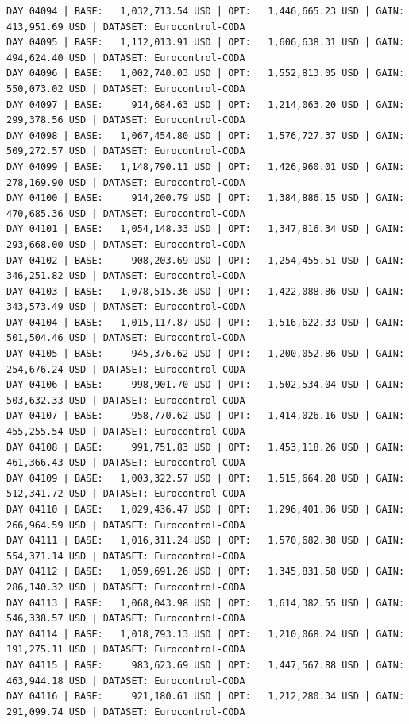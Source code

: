 \documentclass[11pt,a4paper]{article}
\begin{document}
\begin{verbatim}
DAY 04094 | BASE:   1,032,713.54 USD | OPT:   1,446,665.23 USD | GAIN: 413,951.69 USD | DATASET: Eurocontrol-CODA
DAY 04095 | BASE:   1,112,013.91 USD | OPT:   1,606,638.31 USD | GAIN: 494,624.40 USD | DATASET: Eurocontrol-CODA
DAY 04096 | BASE:   1,002,740.03 USD | OPT:   1,552,813.05 USD | GAIN: 550,073.02 USD | DATASET: Eurocontrol-CODA
DAY 04097 | BASE:     914,684.63 USD | OPT:   1,214,063.20 USD | GAIN: 299,378.56 USD | DATASET: Eurocontrol-CODA
DAY 04098 | BASE:   1,067,454.80 USD | OPT:   1,576,727.37 USD | GAIN: 509,272.57 USD | DATASET: Eurocontrol-CODA
DAY 04099 | BASE:   1,148,790.11 USD | OPT:   1,426,960.01 USD | GAIN: 278,169.90 USD | DATASET: Eurocontrol-CODA
DAY 04100 | BASE:     914,200.79 USD | OPT:   1,384,886.15 USD | GAIN: 470,685.36 USD | DATASET: Eurocontrol-CODA
DAY 04101 | BASE:   1,054,148.33 USD | OPT:   1,347,816.34 USD | GAIN: 293,668.00 USD | DATASET: Eurocontrol-CODA
DAY 04102 | BASE:     908,203.69 USD | OPT:   1,254,455.51 USD | GAIN: 346,251.82 USD | DATASET: Eurocontrol-CODA
DAY 04103 | BASE:   1,078,515.36 USD | OPT:   1,422,088.86 USD | GAIN: 343,573.49 USD | DATASET: Eurocontrol-CODA
DAY 04104 | BASE:   1,015,117.87 USD | OPT:   1,516,622.33 USD | GAIN: 501,504.46 USD | DATASET: Eurocontrol-CODA
DAY 04105 | BASE:     945,376.62 USD | OPT:   1,200,052.86 USD | GAIN: 254,676.24 USD | DATASET: Eurocontrol-CODA
DAY 04106 | BASE:     998,901.70 USD | OPT:   1,502,534.04 USD | GAIN: 503,632.33 USD | DATASET: Eurocontrol-CODA
DAY 04107 | BASE:     958,770.62 USD | OPT:   1,414,026.16 USD | GAIN: 455,255.54 USD | DATASET: Eurocontrol-CODA
DAY 04108 | BASE:     991,751.83 USD | OPT:   1,453,118.26 USD | GAIN: 461,366.43 USD | DATASET: Eurocontrol-CODA
DAY 04109 | BASE:   1,003,322.57 USD | OPT:   1,515,664.28 USD | GAIN: 512,341.72 USD | DATASET: Eurocontrol-CODA
DAY 04110 | BASE:   1,029,436.47 USD | OPT:   1,296,401.06 USD | GAIN: 266,964.59 USD | DATASET: Eurocontrol-CODA
DAY 04111 | BASE:   1,016,311.24 USD | OPT:   1,570,682.38 USD | GAIN: 554,371.14 USD | DATASET: Eurocontrol-CODA
DAY 04112 | BASE:   1,059,691.26 USD | OPT:   1,345,831.58 USD | GAIN: 286,140.32 USD | DATASET: Eurocontrol-CODA
DAY 04113 | BASE:   1,068,043.98 USD | OPT:   1,614,382.55 USD | GAIN: 546,338.57 USD | DATASET: Eurocontrol-CODA
DAY 04114 | BASE:   1,018,793.13 USD | OPT:   1,210,068.24 USD | GAIN: 191,275.11 USD | DATASET: Eurocontrol-CODA
DAY 04115 | BASE:     983,623.69 USD | OPT:   1,447,567.88 USD | GAIN: 463,944.18 USD | DATASET: Eurocontrol-CODA
DAY 04116 | BASE:     921,180.61 USD | OPT:   1,212,280.34 USD | GAIN: 291,099.74 USD | DATASET: Eurocontrol-CODA

\end{verbatim}
\end{document}
